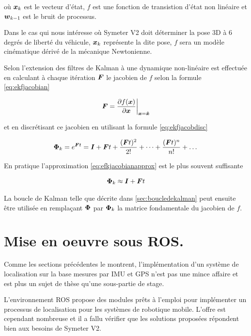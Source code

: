 \documentclass[12pt,a4paper]{report}
\begin{document}
	où $\boldsymbol{x}_k$ est le vecteur d'état, $f$ est une fonction de transistion d'état non linéaire et $\boldsymbol{w}_{k-1}$ est le bruit de processus.
	
	\para Dans le cas qui nous intéresse où Symeter V2 doit déterminer la pose 3D à 6 degrés de liberté du véhicule, $\boldsymbol{x}_k$ représente la dite pose, $f$ sera un modèle cinématique dérivé de la mécanique Newtonienne.
	
	\para Selon \cite{zarchan_fundamentals_2009} l'extension des filtres de Kalman à une dynamique non-linéaire est effectuée en calculant à chaque itération $\boldsymbol{F}$ le jacobien de $f$ selon la formule \ref{eq:ekfjacobian}
	
	\begin{equation}
	\label{eq:ekfjacobian}
	\boldsymbol{F} = \frac{\partial f(\boldsymbol{x})}{\partial \boldsymbol{x}} \bigg\rvert_{\boldsymbol{x}= \boldsymbol{\hat{x}}}
	\end{equation}
	
	\para et en discrétisant ce jacobien en utilisant la formule \ref{eq:ekfjacobdisc}
	
	\begin{equation}
	\label{eq:ekfjacobdisc}
	\boldsymbol{\Phi}_k = e^{\boldsymbol Ft} = \boldsymbol I + \boldsymbol Ft + \frac{(\boldsymbol Ft)^2}{2!} + \dots + \frac{(\boldsymbol Ft)^n}{n!} + \dots
	\end{equation}
	
	\para En pratique l'approximation \ref{eq:efkjacobianapprox} est le plus souvent suffisante
	
	\begin{equation}
	\label{eq:efkjacobianapprox}
	\boldsymbol{\Phi}_k \approx \boldsymbol I + \boldsymbol Ft
	\end{equation}
	
	La boucle de Kalman telle que décrite dans \ref{sec:boucledekalman} peut ensuite être utilisée en remplaçant $\boldsymbol{\Phi}$ par $\boldsymbol{\Phi}_k$ la matrice fondamentale du jacobien de $f$.

	
	\section{Mise en oeuvre sous ROS.} Comme les sections précédentes le montrent, l'implémentation d'un système de localisation sur la base mesures par IMU et GPS n'est pas une mince affaire et est plus un sujet de thèse qu'une sous-partie de stage. 
	
	\para L'environnement ROS propose des modules prêts à l'emploi pour implémenter un processus de localisation pour les systèmes de robotique mobile. L'offre est cependant nombreuse et il a fallu vérifier que les solutions proposées répondent bien aux besoins de Symeter V2.
	
\end{document}
